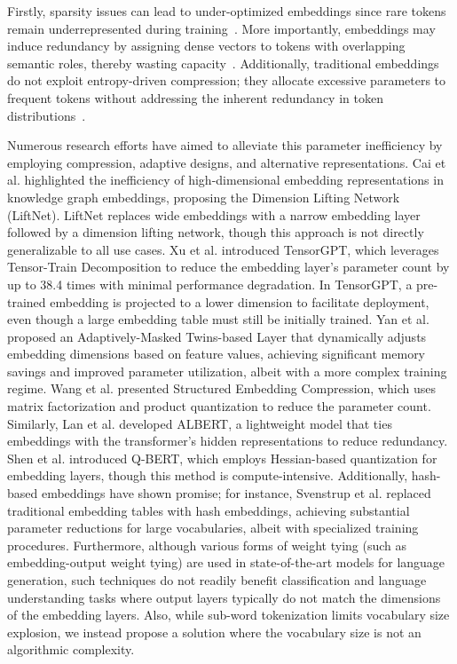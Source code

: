 \documentclass{article}
\begin{document}
Firstly, sparsity issues can lead to under-optimized embeddings since rare tokens remain underrepresented during training~\cite{svenstrup2017hash}. More importantly, embeddings may induce redundancy by assigning dense vectors to tokens with overlapping semantic roles, thereby wasting capacity~\cite{lan2019albert}. Additionally, traditional embeddings do not exploit entropy-driven compression; they allocate excessive parameters to frequent tokens without addressing the inherent redundancy in token distributions~\cite{shu2017compressing}.

Numerous research efforts have aimed to alleviate this parameter inefficiency by employing compression, adaptive designs, and alternative representations. Cai et al. \cite{cai2023dimensionlifting} highlighted the inefficiency of high-dimensional embedding representations in knowledge graph embeddings, proposing the Dimension Lifting Network (LiftNet). LiftNet replaces wide embeddings with a narrow embedding layer followed by a dimension lifting network, though this approach is not directly generalizable to all use cases. Xu et al. \cite{xu2023tensorgpt} introduced TensorGPT, which leverages Tensor-Train Decomposition to reduce the embedding layer's parameter count by up to 38.4 times with minimal performance degradation. In TensorGPT, a pre-trained embedding is projected to a lower dimension to facilitate deployment, even though a large embedding table must still be initially trained. Yan et al. \cite{yan2021adaptivemaskedtwins} proposed an Adaptively-Masked Twins-based Layer that dynamically adjusts embedding dimensions based on feature values, achieving significant memory savings and improved parameter utilization, albeit with a more complex training regime. Wang et al. \cite{wang2020structured} presented Structured Embedding Compression, which uses matrix factorization and product quantization to reduce the parameter count. Similarly, Lan et al. \cite{lan2019albert} developed ALBERT, a lightweight model that ties embeddings with the transformer's hidden representations to reduce redundancy. Shen et al. \cite{shen2020qbert} introduced Q-BERT, which employs Hessian-based quantization for embedding layers, though this method is compute-intensive. Additionally, hash-based embeddings have shown promise; for instance, Svenstrup et al. \cite{svenstrup2017hash} replaced traditional embedding tables with hash embeddings, achieving substantial parameter reductions for large vocabularies, albeit with specialized training procedures. Furthermore, although various forms of weight tying (such as embedding-output weight tying) are used in state-of-the-art models for language generation, such techniques do not readily benefit classification and language understanding tasks where output layers typically do not match the dimensions of the embedding layers. Also, while sub-word tokenization limits vocabulary size explosion, we instead propose a solution where the vocabulary size is not an algorithmic complexity.
\end{document}
